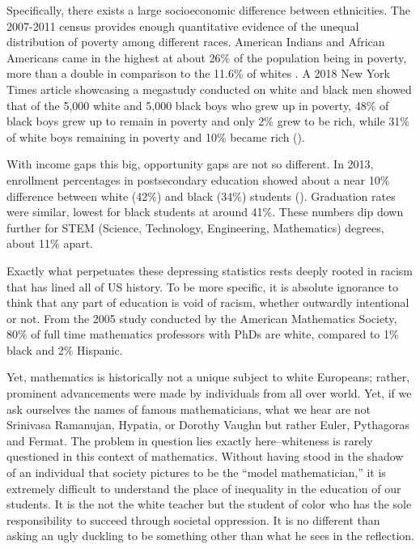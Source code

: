 Specifically, there exists a large socioeconomic difference between ethnicities. The 2007-2011 census provides enough quantitative evidence of the unequal distribution of poverty among different races. American Indians and African Americans came in the highest at about 26\% of the population being in poverty, more than a double in comparison to the 11.6\% of whites \citep{macartney}. A 2018 New York Times article showcasing a megastudy conducted on white and black men showed that of the 5,000 white and 5,000 black boys who grew up in poverty, 48\% of black boys grew up to remain in poverty and only 2\% grew to be rich, while 31\% of white boys remaining in poverty and 10\% became rich (\cite{badger_extensive_2018}).

With income gaps this big, opportunity gaps are not so different. In 2013, enrollment percentages in postsecondary education showed about a near 10\% difference between white (42\%) and black (34\%) students (\cite{musu-gillette_status_nodate}). Graduation rates were similar, lowest for black students at around 41\%. These numbers dip down further for STEM (Science, Technology, Engineering, Mathematics) degrees, about 11\% apart.

Exactly what perpetuates these depressing statistics rests deeply rooted in racism that has lined all of US history. To be more specific, it is absolute ignorance to think that any part of education is void of racism, whether outwardly intentional or not. From the 2005 study conducted by the American Mathematics Society, 80\% of full time mathematics professors with PhDs are white, compared to 1\% black and 2\% Hispanic.

Yet, mathematics is historically not a unique subject to white Europeans; rather, prominent advancements were made by individuals from all over world. Yet, if we ask ourselves the names of famous mathematicians, what we hear are not Srinivasa Ramanujan, Hypatia, or Dorothy Vaughn but rather Euler, Pythagoras and Fermat. The problem in question lies exactly here--whiteness is rarely questioned in this context of mathematics. Without having stood in the shadow of an individual that society pictures to be the ``model mathematician,'' it is extremely difficult to understand the place of inequality in the education of our students. It is the not the white teacher but the student of color who has the sole responsibility to succeed through societal oppression. It is no different than asking an ugly duckling to be something other than what he sees in the reflection.

